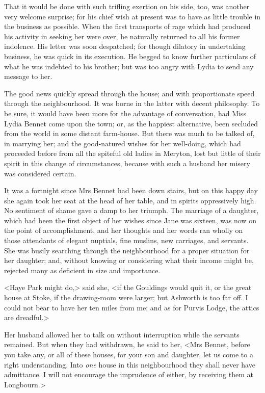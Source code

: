 That it would be done with such trifling exertion on his side, too, was another very welcome surprise; for his chief wish at present was to have as little trouble in the business as possible. When the first transports of rage which had produced his activity in seeking her were over, he naturally returned to all his former indolence. His letter was soon despatched; for though dilatory in undertaking business, he was quick in its execution. He begged to know further particulars of what he was indebted to his brother; but was too angry with Lydia to send any message to her.

The good news quickly spread through the house; and with proportionate speed through the neighbourhood. It was borne in the latter with decent philosophy. To be sure, it would have been more for the advantage of conversation, had Miss Lydia Bennet come upon the town; or, as the happiest alternative, been secluded from the world in some distant farm-house. But there was much to be talked of, in marrying her; and the good-natured wishes for her well-doing, which had proceeded before from all the spiteful old ladies in Meryton, lost but little of their spirit in this change of circumstances, because with such a husband her misery was considered certain.

It was a fortnight since Mrs Bennet had been down stairs, but on this happy day she again took her seat at the head of her table, and in spirits oppressively high. No sentiment of shame gave a damp to her triumph. The marriage of a daughter, which had been the first object of her wishes since Jane was sixteen, was now on the point of accomplishment, and her thoughts and her words ran wholly on those attendants of elegant nuptials, fine muslins, new carriages, and servants. She was busily searching through the neighbourhood for a proper situation for her daughter; and, without knowing or considering what their income might be, rejected many as deficient in size and importance.

<Haye Park might do,> said she, <if the Gouldings would quit it, or the great house at Stoke, if the drawing-room were larger; but Ashworth is too far off. I could not bear to have her ten miles from me; and as for Purvis Lodge, the attics are dreadful.>

Her husband allowed her to talk on without interruption while the servants remained. But when they had withdrawn, he said to her, <Mrs Bennet, before you take any, or all of these houses, for your son and daughter, let us come to a right understanding. Into \textit{one} house in this neighbourhood they shall never have admittance. I will not encourage the imprudence of either, by receiving them at Longbourn.>

